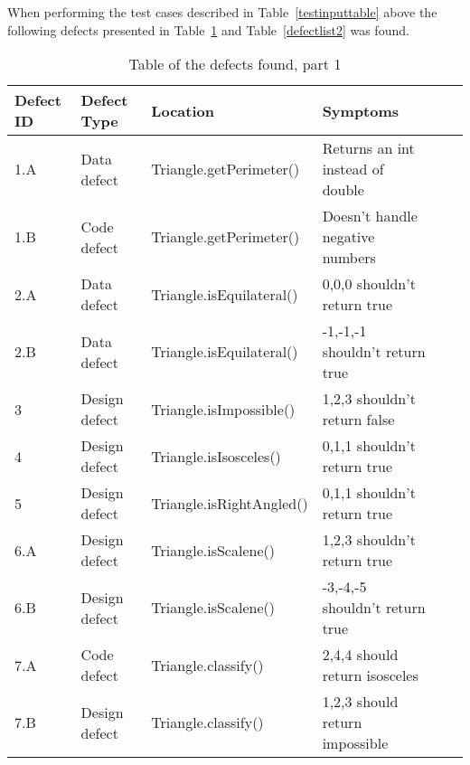 When performing the test cases described in Table~\ref{testinputtable} above the following defects presented in Table~\ref{defectlist1} and Table~\ref{defectlist2} was found.

\begin{table}[!htb]
\caption{Table of the defects found, part 1}
\label{defectlist1}
\begin{tabular}{|l|l|l|l|l|l|}
\hline  Defect ID & Defect Type   & Location  & Symptoms\\ \hline
1.A       & Data defect   & Triangle.getPerimeter()  & Returns an int instead of double \\
1.B       & Code defect   & Triangle.getPerimeter()  & Doesn't handle negative numbers  \\
2.A       & Data defect   & Triangle.isEquilateral() & 0,0,0 shouldn't return true      \\
2.B       & Data defect   & Triangle.isEquilateral() & -1,-1,-1 shouldn't return true   \\
3         & Design defect & Triangle.isImpossible()  & 1,2,3 shouldn't return false     \\
4         & Design defect & Triangle.isIsosceles()   & 0,1,1 shouldn't return true      \\
5         & Design defect & Triangle.isRightAngled() & 0,1,1 shouldn't return true      \\
6.A       & Design defect & Triangle.isScalene()     & 1,2,3 shouldn't return true      \\
6.B       & Design defect & Triangle.isScalene()     & -3,-4,-5 shouldn't return true   \\
7.A       & Code defect   & Triangle.classify()      & 2,4,4 should return isosceles    \\
7.B       & Design defect & Triangle.classify()      & 1,2,3 should return impossible   \\         \hline     
\end{tabular}
\end{table}

